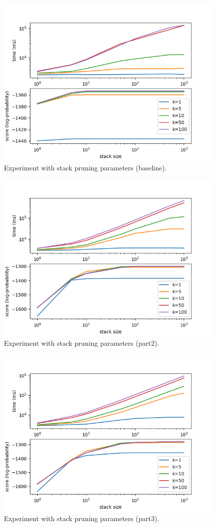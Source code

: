 \documentclass[answers]{exam}
\begin{document}
\begin{figure}
  \centering
  \includegraphics{fig-default}
  \caption[Experiment (baseline).]{Experiment with stack pruning parameters
    (baseline).}
  \label{fig:exp-baseline}
\end{figure}

\begin{figure}
  \centering
  \includegraphics{fig-part2}
  \caption[Experiment (part2).]{Experiment with stack pruning parameters
    (part2).}
  \label{fig:exp-part2}
\end{figure}

\begin{figure}
  \centering
  \includegraphics{fig-part3}
  \caption[Experiment (part3).]{Experiment with stack pruning parameters
    (part3).}
  \label{fig:exp-part3}
\end{figure}
\end{document}
